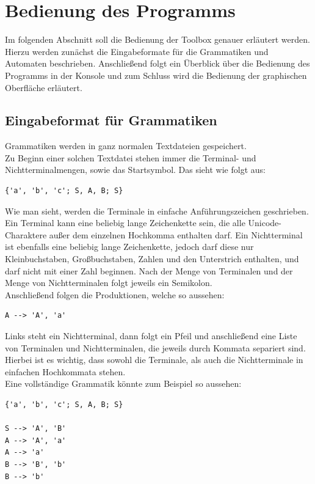 \section{Bedienung des Programms}\raggedbottom
\label{sec:2}
Im folgenden Abschnitt soll die Bedienung der Toolbox genauer erläutert werden. Hierzu werden zunächst die Eingabeformate für die Grammatiken und Automaten beschrieben. Anschließend folgt ein Überblick über die Bedienung des Programms in der Konsole und zum Schluss wird die Bedienung der graphischen Oberfläche erläutert.
\subsection{Eingabeformat für Grammatiken}
\label{sec:2.1}
Grammatiken werden in ganz normalen Textdateien gespeichert.\\
Zu Beginn einer solchen Textdatei stehen immer die Terminal- und Nichtterminalmengen, sowie das Startsymbol. Das sieht wie folgt aus:
\lstset{
	captionpos=b,
	breaklines=true,
}
\begin{lstlisting}[frame=single, caption=Definition der Termiale und Nichtterminale]
{'a', 'b', 'c'; S, A, B; S}
\end{lstlisting}
Wie man sieht, werden die Terminale in einfache Anführungszeichen geschrieben. Ein Terminal kann eine beliebig lange Zeichenkette sein, die alle Unicode-Charaktere außer dem einzelnen Hochkomma enthalten darf. Ein Nichtterminal ist ebenfalls eine beliebig lange Zeichenkette, jedoch darf diese nur Kleinbuchstaben, Großbuchstaben, Zahlen und den Unterstrich enthalten, und darf nicht mit einer Zahl beginnen. Nach der Menge von Terminalen und der Menge von Nichtterminalen folgt jeweils ein Semikolon.\\
Anschließend folgen die Produktionen, welche so aussehen:
\begin{lstlisting}[frame=single, caption=Beispiel für eine Produktion in einer Grammatik]
A --> 'A', 'a'
\end{lstlisting}
Links steht ein Nichtterminal, dann folgt ein Pfeil und anschließend eine Liste von Terminalen und Nichtterminalen, die jeweils durch Kommata separiert sind. Hierbei ist es wichtig, dass sowohl die Terminale, als auch die Nichtterminale in einfachen Hochkommata stehen.\\
Eine vollständige Grammatik könnte zum Beispiel so aussehen:
\begin{lstlisting}[frame=single, caption=Beispiel für eine Grammatik]
{'a', 'b', 'c'; S, A, B; S}

S --> 'A', 'B'
A --> 'A', 'a'
A --> 'a'
B --> 'B', 'b'
B --> 'b'
\end{lstlisting}

